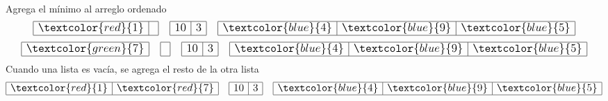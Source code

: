 \documentclass{article}
\begin{document}
\begin{minipage}{0.5\textwidth}
\begin{equation*}
\begin{array}{|r|r|r|}
    \end{array}
  \end{equation*}
  Agrega el mínimo al arreglo ordenado
  \begin{equation*}
    \large
    \begin{array}{|r|r|}
      \hline \textcolor{red}{1} & \\ \hline
    \end{array} \quad
    \begin{array}{|r|r|}
      \hline 10 & 3 \\ \hline
    \end{array}\quad 
    \begin{array}{|r|r|r|}
      \hline \textcolor{blue}{4} & \textcolor{blue}{9} & \textcolor{blue}{5} \\ \hline
    \end{array}
  \end{equation*}
  \begin{equation*}
    \large
    \begin{array}{|r|}
      \hline \textcolor{green}{7} \\ \hline
    \end{array} \quad 
    \begin{array}{|r|}
      \hline \\ \hline
    \end{array} \quad 
    \begin{array}{|r|r|}
      \hline 10 & 3 \\ \hline
    \end{array}\quad 
    \begin{array}{|r|r|r|}
      \hline \textcolor{blue}{4} & \textcolor{blue}{9} & \textcolor{blue}{5} \\ \hline
    \end{array}
  \end{equation*}
  Cuando una lista es vacía, se agrega el resto de la otra lista
  \begin{equation*}
    \large
    \begin{array}{|r|r|}
      \hline \textcolor{red}{1} & \textcolor{red}{7}\\ \hline
    \end{array} \quad
    \begin{array}{|r|r|}
      \hline 10 & 3 \\ \hline
    \end{array}\quad 
    \begin{array}{|r|r|r|}
      \hline \textcolor{blue}{4} & \textcolor{blue}{9} & \textcolor{blue}{5} \\ \hline
    \end{array}
  \end{equation*}
\end{minipage}
\end{document}
